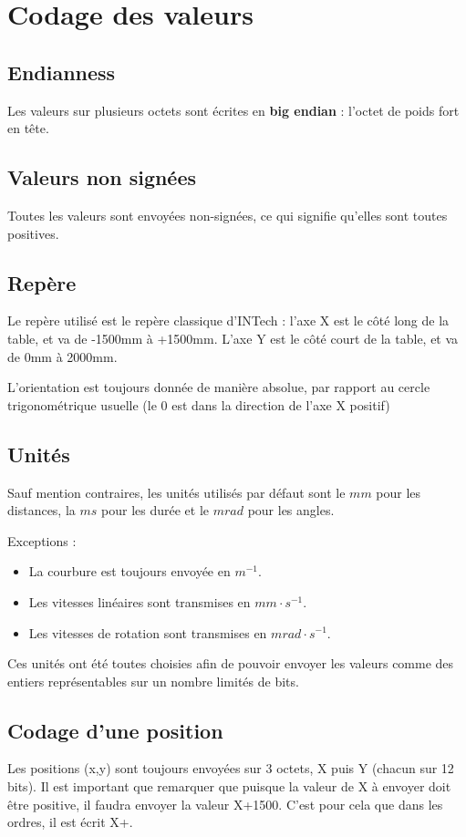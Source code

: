 \documentclass[a4paper, 12pt]{article}
\begin{document}
\section{Codage des valeurs}

\subsection{Endianness}

Les valeurs sur plusieurs octets sont écrites en \textbf{big endian} : l'octet de poids fort en tête.

\subsection{Valeurs non signées}

Toutes les valeurs sont envoyées non-signées, ce qui signifie qu'elles sont toutes positives.

\subsection{Repère}

Le repère utilisé est le repère classique d'INTech : l'axe X est le côté long de la table, et va de -1500mm à +1500mm. L'axe Y est le côté court de la table, et va de 0mm à 2000mm.

L'orientation est toujours donnée de manière absolue, par rapport au cercle trigonométrique usuelle (le 0 est dans la direction de l'axe X positif)

\subsection{Unités}

Sauf mention contraires, les unités utilisés par défaut sont le $mm$ pour les distances, la $ms$ pour les durée et le $mrad$ pour les angles.

Exceptions :
\begin{itemize}
\item La courbure est toujours envoyée en $m^{-1}$.
\item Les vitesses linéaires sont transmises en $mm \cdot s^{-1}$.
\item Les vitesses de rotation sont transmises en $mrad \cdot s^{-1}$.
\end{itemize}

Ces unités ont été toutes choisies afin de pouvoir envoyer les valeurs comme des entiers représentables sur un nombre limités de bits.

\subsection{Codage d'une position}

Les positions (x,y) sont toujours envoyées sur 3 octets, X puis Y (chacun sur 12 bits). Il est important que remarquer que puisque la valeur de X à envoyer doit être positive, il faudra envoyer la valeur X+1500. C'est pour cela que dans les ordres, il est écrit X+.
\end{document}
